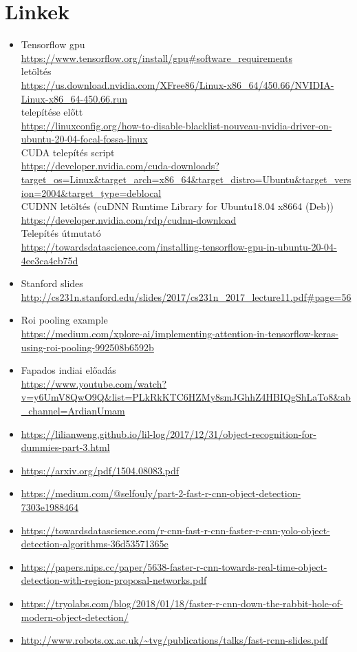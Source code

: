 \documentclass[12pt]{report}
\begin{document}
\chapter{Linkek}
\begin{itemize}
\item Tensorflow gpu 
\\\url{https://www.tensorflow.org/install/gpu#software_requirements}
\\  letöltés
\\\url{https://us.download.nvidia.com/XFree86/Linux-x86_64/450.66/NVIDIA-Linux-x86_64-450.66.run}
\\ telepítése előtt
\\\url{https://linuxconfig.org/how-to-disable-blacklist-nouveau-nvidia-driver-on-ubuntu-20-04-focal-fossa-linux}
\\ CUDA telepítés script
\\\url{https://developer.nvidia.com/cuda-downloads?target_os=Linux&target_arch=x86_64&target_distro=Ubuntu&target_version=2004&target_type=deblocal}
\\ CUDNN letöltés (cuDNN Runtime Library for Ubuntu18.04 x8664 (Deb))
\\\url{https://developer.nvidia.com/rdp/cudnn-download}
\\ Telepítés útmutató
\\\url{https://towardsdatascience.com/installing-tensorflow-gpu-in-ubuntu-20-04-4ee3ca4cb75d}

\item Stanford slides \\\url{http://cs231n.stanford.edu/slides/2017/cs231n_2017_lecture11.pdf#page=56}
\item Roi pooling example \\\url{https://medium.com/xplore-ai/implementing-attention-in-tensorflow-keras-using-roi-pooling-992508b6592b}
\item Fapados indiai előadás \\\url{https://www.youtube.com/watch?v=y6UmV8QwO9Q&list=PLkRkKTC6HZMy8smJGhhZ4HBIQgShLaTo8&ab_channel=ArdianUmam}
\item \url{https://lilianweng.github.io/lil-log/2017/12/31/object-recognition-for-dummies-part-3.html}
\item \url{https://arxiv.org/pdf/1504.08083.pdf}
\item \url{https://medium.com/@selfouly/part-2-fast-r-cnn-object-detection-7303e1988464}
\item \url{https://towardsdatascience.com/r-cnn-fast-r-cnn-faster-r-cnn-yolo-object-detection-algorithms-36d53571365e}
\item \url{https://papers.nips.cc/paper/5638-faster-r-cnn-towards-real-time-object-detection-with-region-proposal-networks.pdf}
\item \url{https://tryolabs.com/blog/2018/01/18/faster-r-cnn-down-the-rabbit-hole-of-modern-object-detection/}
\item \url{http://www.robots.ox.ac.uk/~tvg/publications/talks/fast-rcnn-slides.pdf}
\end{itemize}
\end{document}
